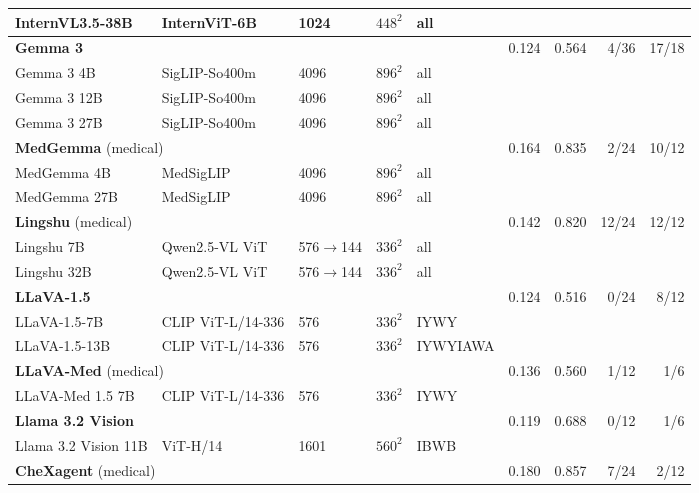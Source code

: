 \begin{table}[pos=tp]
{\begin{tabular}{lllll@{\hspace{8pt}}rrrr}
\quad InternVL3.5-38B & InternViT-6B & 1024 & $448^2$ & all & & & & \\
\midrule
\multicolumn{5}{l}{\textbf{Gemma 3}\cite{gemma2025gemma3}} & 0.124 & 0.564 & \cellcolor{cfTerra2}4/36 & \cellcolor{cfTerra4}17/18 \\
\quad Gemma 3 4B & SigLIP-So400m & 4096 & $896^2$ & all & & & & \\
\quad Gemma 3 12B & SigLIP-So400m & 4096 & $896^2$ & all & & & & \\
\quad Gemma 3 27B & SigLIP-So400m & 4096 & $896^2$ & all & & & & \\
\midrule
\multicolumn{5}{l}{\textbf{MedGemma} (medical)\cite{sellergren2025medgemma}} & 0.164 & 0.835 & \cellcolor{cfTerra2}2/24 & \cellcolor{cfTerra3}10/12 \\
\quad MedGemma 4B & MedSigLIP & 4096 & $896^2$ & all & & & & \\
\quad MedGemma 27B & MedSigLIP & 4096 & $896^2$ & all & & & & \\
\midrule
\multicolumn{5}{l}{\textbf{Lingshu} (medical)\cite{lasa2025lingshu}} & 0.142 & 0.820 & \cellcolor{cfTerra4}12/24 & \cellcolor{cfTerra4}12/12 \\
\quad Lingshu 7B & Qwen2.5-VL ViT & 576$\to$144 & $336^2$ & all & & & & \\
\quad Lingshu 32B & Qwen2.5-VL ViT & 576$\to$144 & $336^2$ & all & & & & \\
\midrule
\multicolumn{5}{l}{\textbf{LLaVA-1.5}\cite{liu2024improved}} & 0.124 & 0.516 & \cellcolor{cfTerra1}0/24 & \cellcolor{cfTerra3}8/12 \\
\quad LLaVA-1.5-7B & CLIP ViT-L/14-336 & 576 & $336^2$ & IYWY & & & & \\
\quad LLaVA-1.5-13B & CLIP ViT-L/14-336 & 576 & $336^2$ & IYWYIAWA & & & & \\
\midrule
\multicolumn{5}{l}{\textbf{LLaVA-Med} (medical)\cite{li2023llavamed}} & 0.136 & 0.560 & \cellcolor{cfTerra2}1/12 & \cellcolor{cfTerra2}1/6 \\
\quad LLaVA-Med 1.5 7B & CLIP ViT-L/14-336 & 576 & $336^2$ & IYWY & & & & \\
\midrule
\multicolumn{5}{l}{\textbf{Llama 3.2 Vision}\cite{meta2024llama32vision}} & 0.119 & 0.688 & \cellcolor{cfTerra1}0/12 & \cellcolor{cfTerra2}1/6 \\
\quad Llama 3.2 Vision 11B & ViT-H/14 & 1601 & $560^2$ & IBWB & & & & \\
\midrule
\multicolumn{5}{l}{\textbf{CheXagent} (medical)\cite{chen2024chexagent}} & 0.180 & 0.857 & \cellcolor{cfTerra3}7/24 & \cellcolor{cfTerra2}2/12 \\

\end{tabular}}
\end{table}
